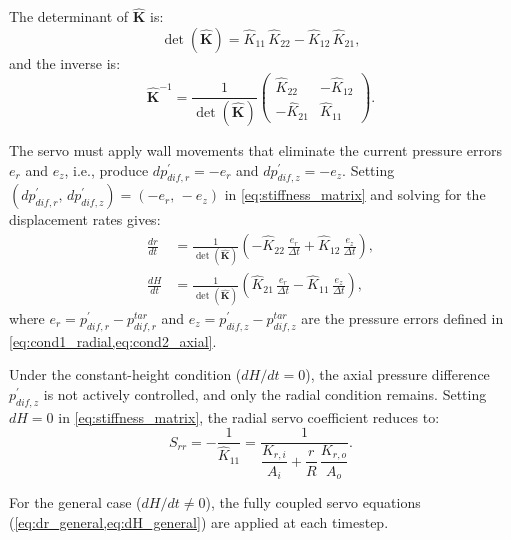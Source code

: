 The determinant of $\hat{\mathbf{K}}$ is:
\begin{equation}
\det(\hat{\mathbf{K}}) = \hat{K}_{11}\,\hat{K}_{22} - \hat{K}_{12}\,\hat{K}_{21},
\label{eq:det_K}
\end{equation}
and the inverse is:
\begin{equation}
\hat{\mathbf{K}}^{-1}
=
\frac{1}{\det(\hat{\mathbf{K}})}
\begin{pmatrix} \hat{K}_{22} & -\hat{K}_{12} \\[6pt] -\hat{K}_{21} & \hat{K}_{11} \end{pmatrix}.
\label{eq:stiffness_matrix_inv}
\end{equation}

The servo must apply wall movements that eliminate the current pressure errors $e_r$ and $e_z$, i.e., produce $dp_{dif,r}^{\prime}=-e_r$ and $dp_{dif,z}^{\prime}=-e_z$. Setting $(dp_{dif,r}^{\prime},\,dp_{dif,z}^{\prime})=(-e_r,\,-e_z)$ in \cref{eq:stiffness_matrix} and solving for the displacement rates gives:
\begin{align}
\frac{dr}{dt} &= \frac{1}{\det(\hat{\mathbf{K}})}\!\left(-\hat{K}_{22}\,\frac{e_r}{\Delta t} + \hat{K}_{12}\,\frac{e_z}{\Delta t}\right), \label{eq:dr_general}\\[6pt]
\frac{dH}{dt} &= \frac{1}{\det(\hat{\mathbf{K}})}\!\left(\hat{K}_{21}\,\frac{e_r}{\Delta t} - \hat{K}_{11}\,\frac{e_z}{\Delta t}\right), \label{eq:dH_general}
\end{align}
where $e_r=p_{dif,r}^{\prime}-p_{dif,r}^{tar}$ and $e_z=p_{dif,z}^{\prime}-p_{dif,z}^{tar}$ are the pressure errors defined in \cref{eq:cond1_radial,eq:cond2_axial}.

Under the constant-height condition ($dH/dt=0$), the axial pressure difference $p_{dif,z}^{\prime}$ is not actively controlled, and only the radial condition remains. Setting $dH=0$ in \cref{eq:stiffness_matrix}, the radial servo coefficient reduces to:
\begin{equation}
S_{rr} = -\frac{1}{\hat{K}_{11}} = \frac{1}{\dfrac{K_{r,i}}{A_i}+\dfrac{r}{R}\,\dfrac{K_{r,o}}{A_o}}.
\label{eq:Srr_constantH}
\end{equation}

For the general case ($dH/dt\neq 0$), the fully coupled servo equations (\cref{eq:dr_general,eq:dH_general}) are applied at each timestep.
